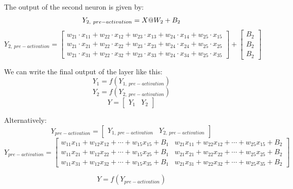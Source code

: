 \documentclass[12pt,a4paper]{article}
\begin{document}
\indent The output of the second neuron is given by:
\[
Y_{2,\ pre-activation} =  X @ W_2 + B_2 \\
\]
\[
Y_{2,\ pre-activation} = \begin{bmatrix}
    w_{21} \cdot x_{11} + w_{22} \cdot x_{12} + w_{23} \cdot x_{13} + w_{24} \cdot x_{14} + w_{25} \cdot x_{15} \\
    w_{21} \cdot x_{21} + w_{22} \cdot x_{22} + w_{23} \cdot x_{23} + w_{24} \cdot x_{24} + w_{25} \cdot x_{25} \\
    w_{21} \cdot x_{31} + w_{22} \cdot x_{32} + w_{23} \cdot x_{33} + w_{24} \cdot x_{34} + w_{25} \cdot x_{35}
\end{bmatrix}
+ \begin{bmatrix}
    B_2 \\
    B_2 \\
    B_2
\end{bmatrix}
\]

We can write the final output of the layer like this:
\[
    Y_1 = f(Y_{1,\ pre-activation})
\] 
\[
    Y_2 = f(Y_{2,\ pre-activation})
\]
\[
    Y = \begin{bmatrix}
        Y_1 & Y_2
    \end{bmatrix}
\]

Alternatively:
\[
Y_{pre-activation} = \begin{bmatrix}
    Y_{1,\ pre-activation} & Y_{2,\ pre-activation}
\end{bmatrix}
\]
\[
Y_{pre-activation} = \begin{bmatrix}
    w_{11}x_{11} + w_{12}x_{12} + \cdots + w_{15}x_{15} + B_1  & w_{21}x_{11} + w_{22}x_{12} + \cdots + w_{25}x_{15} + B_2 \\
    w_{11}x_{21} + w_{12}x_{22} + \cdots + w_{15}x_{25} + B_1  & w_{21}x_{21} + w_{22}x_{22} + \cdots + w_{25}x_{25} + B_2\\
    w_{11}x_{31} + w_{12}x_{32} + \cdots + w_{15}x_{35} + B_1  & w_{21}x_{31} + w_{22}x_{32} + \cdots + w_{25}x_{35} + B_2
\end{bmatrix}
\]

\[
Y = f(Y_{pre-activation})
\]
\end{document}
